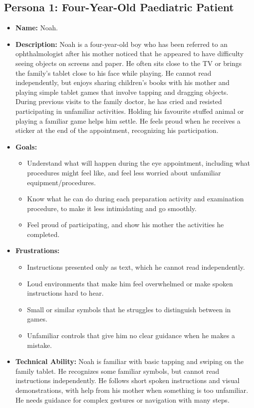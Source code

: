 \documentclass[12pt]{article}
\begin{document}
\subsection{Persona 1: Four-Year-Old Paediatric Patient}
\begin{itemize}
\item \textbf{Name:} Noah.

\item \textbf{Description:} Noah is a four-year-old boy who has been referred
to an ophthalmologist after his mother noticed that he appeared to have
difficulty seeing objects on screens and paper. He often sits close to the
TV or brings the family's tablet close to his face while playing.
He cannot read independently, but enjoys sharing children's books with his
mother and playing simple tablet games that involve tapping and
dragging objects. During previous visits to the family doctor, he has cried
and resisted participating in unfamiliar activities. Holding his favourite
stuffed animal or playing a familiar game helps him settle.
He feels proud when he receives a sticker at the end of the appointment,
recognizing his participation.

\item \textbf{Goals:}
\begin{itemize}
    \item Understand what will happen during the eye appointment, including what
    procedures might feel like, and feel less worried about unfamiliar equipment/procedures.
    \item Know what he can do during each preparation activity and examination
    procedure, to make it less intimidating and go smoothly.
    \item Feel proud of participating, and show his mother the activities he completed.
\end{itemize}

\item \textbf{Frustrations:}
\begin{itemize}
    \item Instructions presented only as text, which he cannot read independently.
    \item Loud environments that make him feel overwhelmed or make spoken
    instructions hard to hear.
    \item Small or similar symbols that he struggles to distinguish between
    in games.
    \item Unfamiliar controls that give him no clear guidance
    when he makes a mistake.
\end{itemize}

\item \textbf{Technical Ability:} Noah is familiar with basic tapping and
swiping on the family tablet. He recognizes some familiar symbols, but cannot read instructions independently.
He follows short spoken instructions and visual demonstrations, with help
from his mother when something is too unfamiliar. He needs guidance for
complex gestures or navigation with many steps.
\end{itemize}
\end{document}
